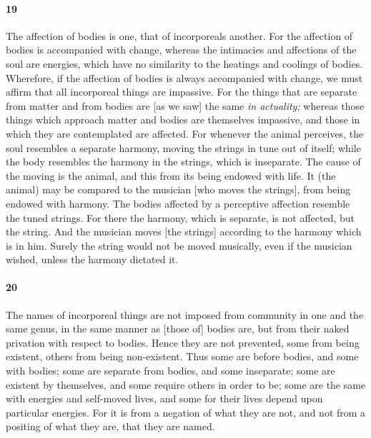 \documentclass[12pt]{article}
\begin{document}
\paragraph{19} The affection of bodies is one, that of incorporeals another. For the affection of bodies is accompanied with change, whereas the intimacies and affections of the soul are energies, which have no similarity to the heatings and coolings of bodies. Wherefore, if the affection of bodies is always accompanied with change, we must affirm that all incorporeal things are impassive. For the things that are separate from matter and from bodies are [as we saw] the same \textit{in actuality;} whereas those things which approach matter and bodies are themselves impassive, and those in which they are contemplated are affected. For whenever the animal perceives, the soul resembles a separate harmony, moving the strings in tune out of itself; while the body resembles the harmony in the strings, which is inseparate. The cause of the moving is the animal, and this from its being endowed with life. It (the animal) may be compared to the musician [who moves the strings], from being endowed with harmony. The bodies affected by a perceptive affection resemble the tuned strings. For there the harmony, which is separate, is not affected, but the string. And the musician moves [the strings] according to the harmony which is in him. Surely the string would not be moved musically, even if the musician wished, unless the harmony dictated it.

\paragraph{20} The names of incorporeal things are not imposed from community in one and the same genus, in the same manner as [those of] bodies are, but from their naked privation with respect to bodies. Hence they are not prevented, some from being existent, others from being non-existent. Thus some are before bodies, and some with bodies; some are separate from bodies, and some inseparate; some are existent by themselves, and some require others in order to be; some are the same with energies and self-moved lives, and some for their lives depend upon particular energies. For it is from a negation of what they are not, and not from a positing of what they are, that they are named.
\end{document}
